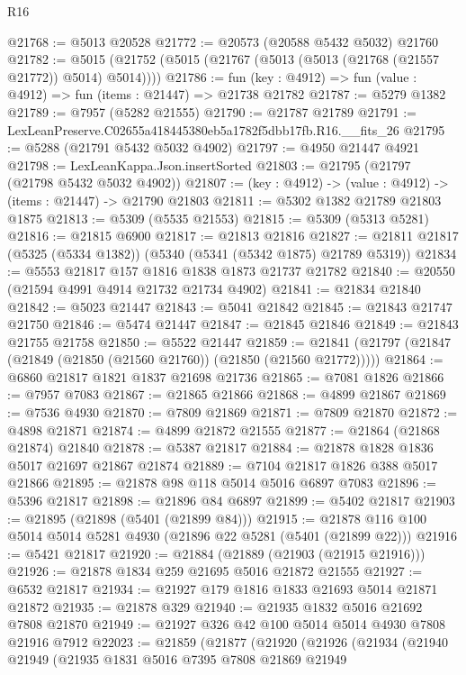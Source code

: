 \begin{lexlean}{R16}
\begin{coremodule}
@21768 := @5013 @20528
@21772 := @20573 (@20588 @5432 @5032) @21760
@21782 := @5015 (@21752 (@5015 (@21767 (@5013 (@5013 (@21768 (@21557 @21772)) @5014) @5014))))
@21786 := fun (key : @4912) => fun (value : @4912) => fun (items : @21447) => @21738 @21782
@21787 := @5279 @1382
@21789 := @7957 (@5282 @21555)
@21790 := @21787 @21789
@21791 := LexLeanPreserve.C02655a418445380eb5a1782f5dbb17fb.R16.__fits_26
@21795 := @5288 (@21791 @5432 @5032 @4902)
@21797 := @4950 @21447 @4921
@21798 := LexLeanKappa.Json.insertSorted
@21803 := @21795 (@21797 (@21798 @5432 @5032 @4902))
@21807 := (key : @4912) -> (value : @4912) -> (items : @21447) -> @21790 @21803
@21811 := @5302 @1382 @21789 @21803 @1875
@21813 := @5309 (@5535 @21553)
@21815 := @5309 (@5313 @5281)
@21816 := @21815 @6900
@21817 := @21813 @21816
@21827 := @21811 @21817 (@5325 (@5334 @1382)) (@5340 (@5341 (@5342 @1875) @21789 @5319))
@21834 := @5553 @21817 @157 @1816 @1838 @1873 @21737 @21782
@21840 := @20550 (@21594 @4991 @4914 @21732 @21734 @4902)
@21841 := @21834 @21840
@21842 := @5023 @21447
@21843 := @5041 @21842
@21845 := @21843 @21747 @21750
@21846 := @5474 @21447
@21847 := @21845 @21846
@21849 := @21843 @21755 @21758
@21850 := @5522 @21447
@21859 := @21841 (@21797 (@21847 (@21849 (@21850 (@21560 @21760)) (@21850 (@21560 @21772)))))
@21864 := @6860 @21817 @1821 @1837 @21698 @21736
@21865 := @7081 @1826
@21866 := @7957 @7083
@21867 := @21865 @21866
@21868 := @4899 @21867
@21869 := @7536 @4930
@21870 := @7809 @21869
@21871 := @7809 @21870
@21872 := @4898 @21871
@21874 := @4899 @21872 @21555
@21877 := @21864 (@21868 @21874) @21840
@21878 := @5387 @21817
@21884 := @21878 @1828 @1836 @5017 @21697 @21867 @21874
@21889 := @7104 @21817 @1826 @388 @5017 @21866
@21895 := @21878 @98 @118 @5014 @5016 @6897 @7083
@21896 := @5396 @21817
@21898 := @21896 @84 @6897
@21899 := @5402 @21817
@21903 := @21895 (@21898 (@5401 (@21899 @84)))
@21915 := @21878 @116 @100 @5014 @5014 @5281 @4930 (@21896 @22 @5281 (@5401 (@21899 @22)))
@21916 := @5421 @21817
@21920 := @21884 (@21889 (@21903 (@21915 @21916)))
@21926 := @21878 @1834 @259 @21695 @5016 @21872 @21555
@21927 := @6532 @21817
@21934 := @21927 @179 @1816 @1833 @21693 @5014 @21871 @21872
@21935 := @21878 @329
@21940 := @21935 @1832 @5016 @21692 @7808 @21870
@21949 := @21927 @326 @42 @100 @5014 @5014 @4930 @7808 @21916 @7912
@22023 := @21859
    (@21877
      (@21920
        (@21926
          (@21934
            (@21940
              @21949
              (@21935
                @1831
                @5016
                @7395
                @7808
                @21869
                @21949

\end{coremodule}
\end{lexlean}
